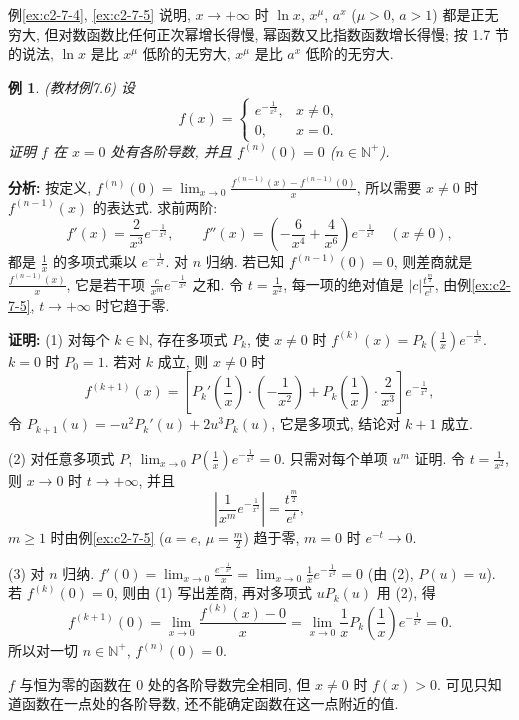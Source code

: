 \documentclass[UTF8,openany]{ctexbook}
\theoremstyle{chinesetextbook}
\newtheorem{example}{例}[section]
\newenvironment{cnproof}{\par\indent\textbf{证明:} \ignorespaces}{\par}
\begin{document}
例\ref{ex:c2-7-4}, \ref{ex:c2-7-5} 说明, $x\to+\infty$ 时 $\ln x$, $x^\mu$, $a^x$ ($\mu>0$, $a>1$) 都是正无穷大, 但对数函数比任何正次幂增长得慢, 幂函数又比指数函数增长得慢; 按 1.7 节的说法, $\ln x$ 是比 $x^\mu$ 低阶的无穷大, $x^\mu$ 是比 $a^x$ 低阶的无穷大.
\begin{example}\label{ex:c2-7-6}
\textnormal{(教材例7.6)} 设
\[
f(x)=\begin{cases}e^{-\frac1{x^2}},&x\ne0,\\0,&x=0.\end{cases}
\]
证明 $f$ 在 $x=0$ 处有各阶导数, 并且 $f^{(n)}(0)=0$ ($n\in\mathbb N^+$).
\end{example}
\par\indent\textbf{分析:} 按定义, $\displaystyle f^{(n)}(0)=\lim_{x\to0}\frac{f^{(n-1)}(x)-f^{(n-1)}(0)}x$, 所以需要 $x\ne0$ 时 $f^{(n-1)}(x)$ 的表达式. 求前两阶:
\[
f'(x)=\frac2{x^3}e^{-\frac1{x^2}},\qquad f''(x)=\left(-\frac6{x^4}+\frac4{x^6}\right)e^{-\frac1{x^2}}\quad(x\ne0),
\]
都是 $\displaystyle\frac1x$ 的多项式乘以 $e^{-\frac1{x^2}}$. 对 $n$ 归纳. 若已知 $f^{(n-1)}(0)=0$, 则差商就是 $\displaystyle\frac{f^{(n-1)}(x)}x$, 它是若干项 $\displaystyle\frac c{x^m}e^{-\frac1{x^2}}$ 之和. 令 $\displaystyle t=\frac1{x^2}$, 每一项的绝对值是 $\displaystyle|c|\frac{t^{\frac m2}}{e^t}$, 由例\ref{ex:c2-7-5}, $t\to+\infty$ 时它趋于零.
\begin{cnproof}
(1) 对每个 $k\in\mathbb N$, 存在多项式 $P_k$, 使 $x\ne0$ 时 $\displaystyle f^{(k)}(x)=P_k\left(\frac1x\right)e^{-\frac1{x^2}}$. $k=0$ 时 $P_0=1$. 若对 $k$ 成立, 则 $x\ne0$ 时
\[
f^{(k+1)}(x)=\left[P_k'\left(\frac1x\right)\cdot\left(-\frac1{x^2}\right)+P_k\left(\frac1x\right)\cdot\frac2{x^3}\right]e^{-\frac1{x^2}},
\]
令 $P_{k+1}(u)=-u^2P_k'(u)+2u^3P_k(u)$, 它是多项式, 结论对 $k+1$ 成立.

(2) 对任意多项式 $P$, $\displaystyle\lim_{x\to0}P\left(\frac1x\right)e^{-\frac1{x^2}}=0$. 只需对每个单项 $u^m$ 证明. 令 $\displaystyle t=\frac1{x^2}$, 则 $x\to0$ 时 $t\to+\infty$, 并且
\[
\left|\frac1{x^m}e^{-\frac1{x^2}}\right|=\frac{t^{\frac m2}}{e^t},
\]
$m\ge1$ 时由例\ref{ex:c2-7-5} ($a=e$, $\displaystyle\mu=\frac m2$) 趋于零, $m=0$ 时 $e^{-t}\to0$.

(3) 对 $n$ 归纳. $\displaystyle f'(0)=\lim_{x\to0}\frac{e^{-\frac1{x^2}}}x=\lim_{x\to0}\frac1xe^{-\frac1{x^2}}=0$ (由 (2), $P(u)=u$). 若 $f^{(k)}(0)=0$, 则由 (1) 写出差商, 再对多项式 $uP_k(u)$ 用 (2), 得
\[
f^{(k+1)}(0)=\lim_{x\to0}\frac{f^{(k)}(x)-0}x=\lim_{x\to0}\frac1xP_k\left(\frac1x\right)e^{-\frac1{x^2}}=0.
\]
所以对一切 $n\in\mathbb N^+$, $f^{(n)}(0)=0$.
\end{cnproof}
$f$ 与恒为零的函数在 $0$ 处的各阶导数完全相同, 但 $x\ne0$ 时 $f(x)>0$. 可见只知道函数在一点处的各阶导数, 还不能确定函数在这一点附近的值.
\end{document}
